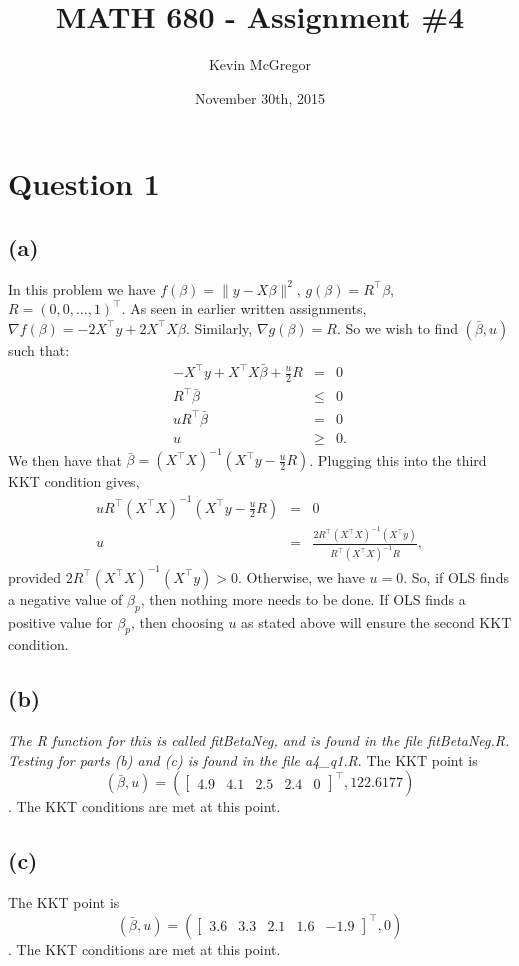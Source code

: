 \documentclass{article}\usepackage[]{graphicx}\usepackage[]{color}
\title{MATH 680 - Assignment \#4}
\author{Kevin McGregor}
\date{November 30th, 2015}
\newcommand{\bb}{\bar{\beta}}
\begin{document}
\maketitle

\section*{Question 1}
\subsection*{(a)}
In this problem we have $f(\beta)=\|y-X\beta\|^2$, $g(\beta)=R^\top\beta$, $R=(0,0,\dots,1)^\top$.  As seen in earlier written assignments, $\nabla f(\beta)=-2X^\top y + 2X^\top X\beta$.  Similarly, $\nabla g(\beta)=R$.  So we wish to find $(\bar{\beta},u)$ such that:
\begin{eqnarray*}
  -X^\top y + X^\top X\bb + \frac{u}{2}R &=& 0 \\
  R^\top \bb &\leq & 0 \\
  uR^\top \bb &=& 0 \\
  u &\geq & 0.
\end{eqnarray*}
We then have that $\bb=(X^\top X)^{-1}(X^\top y -\frac{u}{2}R)$. Plugging this into the third KKT condition gives,
\begin{eqnarray*}
  uR^\top (X^\top X)^{-1}(X^\top y -\frac{u}{2}R) &=& 0 \\
  u &=& \frac{2R^\top (X^\top X)^{-1}(X^\top y)}{R^\top(X^\top X)^{-1}R},
\end{eqnarray*}
provided $2R^\top (X^\top X)^{-1}(X^\top y)>0$.  Otherwise, we have $u=0$.  So, if OLS finds a negative value of $\beta_p$, then nothing more needs to be done.  If OLS finds a positive value for $\beta_p$, then choosing $u$ as stated above will ensure the second KKT condition.

\subsection*{(b)}
\emph{The R function for this is called fitBetaNeg, and is found in the file fitBetaNeg.R.  Testing for parts (b) and (c) is found in the file a4\_q1.R}.  The KKT point is $$(\bb,u)=\left(\begin{bmatrix}4.9 & 4.1 & 2.5 & 2.4 & 0\end{bmatrix}^\top,122.6177\right)$$.  The KKT conditions are met at this point.

\subsection*{(c)}
The KKT point is $$(\bb,u)=\left(\begin{bmatrix}3.6 & 3.3 & 2.1 & 1.6 & -1.9\end{bmatrix}^\top,0\right)$$.  The KKT conditions are met at this point.
\end{document}
